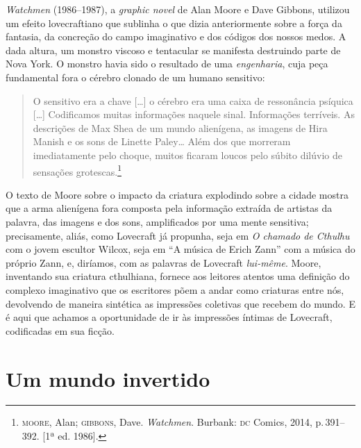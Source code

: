 \emph{Watchmen} (1986--1987), a \emph{graphic novel} de Alan Moore e Dave
Gibbons, utilizou um efeito lovecraftiano que sublinha o que dizia
anteriormente sobre a força da fantasia, da concreção do campo
imaginativo e dos códigos dos nossos medos. A dada altura, um monstro
viscoso e tentacular se manifesta destruindo parte de Nova York. O
monstro havia sido o resultado de uma \emph{engenharia}, cuja peça
fundamental fora o cérebro clonado de um humano sensitivo: 

\begin{quote}
O sensitivo
era a chave [\ldots{}] o cérebro era uma caixa de ressonância psíquica [\ldots{}]
Codificamos muitas informações naquele sinal. Informações terríveis. As
descrições de Max Shea de um mundo alienígena, as imagens de Hira Manish
e os sons de Linette Paley\ldots{} Além dos que morreram imediatamente pelo
choque, muitos ficaram loucos pelo súbito dilúvio de sensações
grotescas.\footnote{\textsc{moore}, Alan; \textsc{gibbons}, Dave. \emph{Watchmen}.
  Burbank: \textsc{dc} Comics, 2014, p.\,391--392. [1ª ed. 1986].}
\end{quote}

O texto de Moore sobre o impacto da criatura explodindo sobre a cidade
mostra que a arma alienígena fora composta pela informação extraída de
artistas da palavra, das imagens e dos sons,
amplificados por uma mente sensitiva; precisamente, aliás, como
Lovecraft já propunha, seja em \emph{O chamado de Cthulhu} com o jovem
escultor Wilcox, seja em ``A música de Erich Zann'' com a música do
próprio Zann, e, diríamos, com as palavras de Lovecraft \emph{lui-même}.
Moore, inventando sua criatura cthulhiana, fornece aos leitores atentos
uma definição do complexo imaginativo que os escritores põem a andar
como criaturas entre nós, devolvendo de maneira sintética as impressões
coletivas que recebem do mundo. E é aqui que achamos a oportunidade de
ir às impressões íntimas de Lovecraft, codificadas em sua ficção.

\section{Um mundo invertido}

